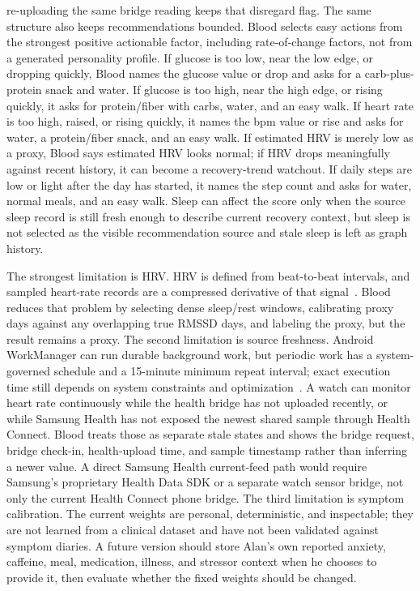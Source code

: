 \documentclass[12pt,letterpaper]{article}
\begin{document}
re-uploading the same bridge reading keeps that disregard flag. The same structure also keeps recommendations bounded. Blood selects easy actions from the strongest positive actionable factor, including rate-of-change factors, not from a generated personality profile. If glucose is too low, near the low edge, or dropping quickly, Blood names the glucose value or drop and asks for a carb-plus-protein snack and water. If glucose is too high, near the high edge, or rising quickly, it asks for protein/fiber with carbs, water, and an easy walk. If heart rate is too high, raised, or rising quickly, it names the bpm value or rise and asks for water, a protein/fiber snack, and an easy walk. If estimated HRV is merely low as a proxy, Blood says estimated HRV looks normal; if HRV drops meaningfully against recent history, it can become a recovery-trend watchout. If daily steps are low or light after the day has started, it names the step count and asks for water, normal meals, and an easy walk. Sleep can affect the score only when the source sleep record is still fresh enough to describe current recovery context, but sleep is not selected as the visible recommendation source and stale sleep is left as graph history.

The strongest limitation is HRV. HRV is defined from beat-to-beat intervals, and sampled heart-rate records are a compressed derivative of that signal~\cite{taskforce1996hrv}. Blood reduces that problem by selecting dense sleep/rest windows, calibrating proxy days against any overlapping true RMSSD days, and labeling the proxy, but the result remains a proxy. The second limitation is source freshness. Android WorkManager can run durable background work, but periodic work has a system-governed schedule and a 15-minute minimum repeat interval; exact execution time still depends on system constraints and optimization~\cite{androidworkmanager2026}. A watch can monitor heart rate continuously while the health bridge has not uploaded recently, or while Samsung Health has not exposed the newest shared sample through Health Connect. Blood treats those as separate stale states and shows the bridge request, bridge check-in, health-upload time, and sample timestamp rather than inferring a newer value. A direct Samsung Health current-feed path would require Samsung's proprietary Health Data SDK or a separate watch sensor bridge, not only the current Health Connect phone bridge. The third limitation is symptom calibration. The current weights are personal, deterministic, and inspectable; they are not learned from a clinical dataset and have not been validated against symptom diaries. A future version should store Alan's own reported anxiety, caffeine, meal, medication, illness, and stressor context when he chooses to provide it, then evaluate whether the fixed weights should be changed.
\end{document}
